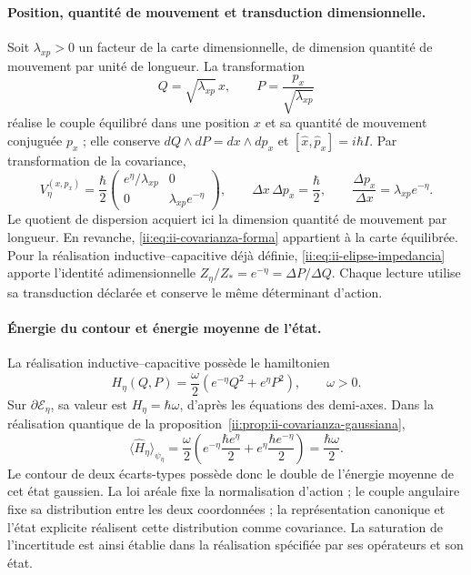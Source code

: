 \paragraph{Position, quantité de mouvement et transduction dimensionnelle.}
Soit \(\lambda_{xp}>0\) un facteur de la carte dimensionnelle, de dimension
quantité de mouvement par unité de longueur. La transformation
\[
 Q=\sqrt{\lambda_{xp}}\,x,\qquad
 P=\frac{p_x}{\sqrt{\lambda_{xp}}}
\]
réalise le couple équilibré dans une position \(x\) et sa quantité de mouvement conjuguée
\(p_x\) ; elle conserve \(dQ\wedge dP=dx\wedge dp_x\) et
\([\widehat x,\widehat p_x]=i\hbar I\). Par transformation de la
covariance,
\begin{equation}
 V_\eta^{(x,p_x)}=\frac{\hbar}{2}
 \begin{pmatrix}e^\eta/\lambda_{xp}&0\\
                 0&\lambda_{xp}e^{-\eta}\end{pmatrix},\qquad
 \Delta x\,\Delta p_x=\frac{\hbar}{2},\qquad
 \frac{\Delta p_x}{\Delta x}=\lambda_{xp}e^{-\eta}.
 \label{ii:eq:ii-covarianza-dimensiones}
\end{equation}
Le quotient de dispersion acquiert ici la dimension quantité de mouvement par longueur.
En revanche, \eqref{ii:eq:ii-covarianza-forma} appartient à la carte équilibrée.
Pour la réalisation inductive--capacitive déjà définie,
\eqref{ii:eq:ii-elipse-impedancia} apporte l'identité adimensionnelle
\(Z_\eta/Z_*=e^{-\eta}=\Delta P/\Delta Q\).
Chaque lecture utilise sa transduction déclarée et conserve le même
déterminant d'action.

\paragraph{Énergie du contour et énergie moyenne de l'état.}
La réalisation inductive--capacitive possède le hamiltonien
\[
 H_\eta(Q,P)=\frac{\omega}{2}
 \left(e^{-\eta}Q^2+e^\eta P^2\right),\qquad \omega>0.
\]
Sur \(\partial\mathcal E_\eta\), sa valeur est
\(H_\eta=\hbar\omega\), d'après les équations des demi-axes. Dans la
réalisation quantique de la proposition~\ref{ii:prop:ii-covarianza-gaussiana},
\begin{equation}
 \langle\widehat H_\eta\rangle_{\psi_\eta}
 =\frac{\omega}{2}
 \left(e^{-\eta}\frac{\hbar e^\eta}{2}
       +e^\eta\frac{\hbar e^{-\eta}}{2}\right)
 =\frac{\hbar\omega}{2}.
 \label{ii:eq:ii-energia-contorno-covarianza}
\end{equation}
Le contour de deux écarts-types possède donc le double de
l'énergie moyenne de cet état gaussien. La loi aréale fixe la normalisation
d'action ; le couple angulaire fixe sa distribution entre les deux coordonnées ;
la représentation canonique et l'état explicite réalisent cette distribution
comme covariance. La saturation de l'incertitude est ainsi établie dans
la réalisation spécifiée par ses opérateurs et son état.
